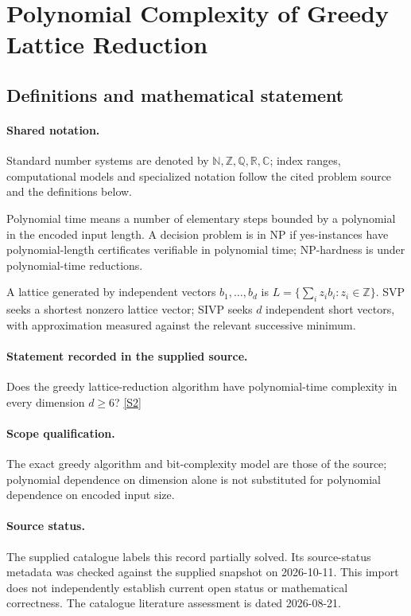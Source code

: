 \documentclass[11pt]{article}
\newcommand{\sref}[2]{\hyperlink{source:#1:#2}{[S#2]}}
\begin{document}
\section{Polynomial Complexity of Greedy Lattice Reduction}\label{statement}

\subsection{Definitions and mathematical statement}

\paragraph{Shared notation.}Standard number systems are denoted by $\mathbb N,\mathbb Z,\mathbb Q,\mathbb R,\mathbb C$; index ranges, computational models and specialized notation follow the cited problem source and the definitions below.


Polynomial time means a number of elementary steps bounded by a polynomial in the encoded input length. A decision problem is in $\mathrm{NP}$ if yes-instances have polynomial-length certificates verifiable in polynomial time; NP-hardness is under polynomial-time reductions.

A lattice generated by independent vectors $b_1,\ldots,b_d$ is $L=\{\sum_i z_i b_i:z_i\in\mathbb Z\}$. SVP seeks a shortest nonzero lattice vector; SIVP seeks $d$ independent short vectors, with approximation measured against the relevant successive minimum.
\paragraph{Statement recorded in the supplied source.}
Does the greedy lattice-reduction algorithm have polynomial-time complexity in every dimension $d\geq6$? \sref{statement}{2}
\paragraph{Scope qualification.}
The exact greedy algorithm and bit-complexity model are those of the source; polynomial dependence on dimension alone is not substituted for polynomial dependence on encoded input size.
\paragraph{Source status.}
The supplied catalogue labels this record partially solved. Its source-status metadata was checked against the supplied snapshot on 2026-10-11. This import does not independently establish current open status or mathematical correctness. The catalogue literature assessment is dated 2026-08-21.
\end{document}
